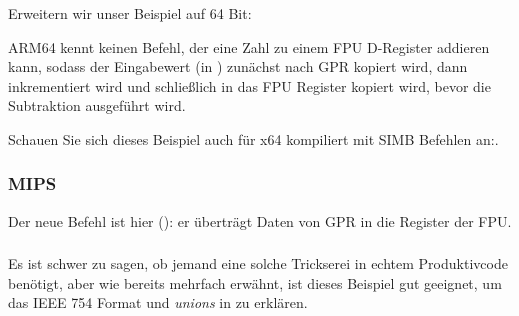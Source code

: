 Erweitern wir unser Beispiel auf 64 Bit:


ARM64 kennt keinen Befehl, der eine Zahl zu einem FPU D-Register addieren kann, sodass der Eingabewert (in )
zunächst nach \ac{GPR} kopiert wird, dann inkrementiert wird und schließlich in das FPU Register  kopiert wird,
bevor die Subtraktion ausgeführt wird.


Schauen Sie sich dieses Beispiel auch für x64 kompiliert mit SIMB Befehlen an:.

\subsubsection{MIPS}

Der neue Befehl ist hier  (): er überträgt Daten von \ac{GPR} in die Register der
FPU.



\subsubsection{\Conclusion}
Es ist schwer zu sagen, ob jemand eine solche Trickserei in echtem Produktivcode benötigt, aber wie bereits mehrfach
erwähnt, ist dieses Beispiel gut geeignet, um das IEEE 754 Format und \emph{unions} in \CCpp zu erklären.


